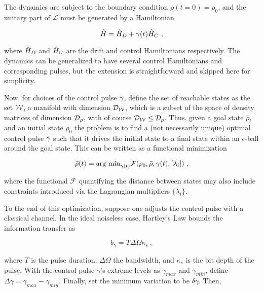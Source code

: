 The dynamics are subject to the boundary condition \(\rho(t=0) = \rho_0\), and
the unitary part of \(\mathcal{L}\) must be generated by a Hamiltonian

\begin{equation}
    \hat{H} = \hat{H}_D + \gamma(t) \hat{H}_C~,
\end{equation}

where \(\hat{H}_D\) and \(\hat{H}_C\) are the drift and control
Hamiltonians respectively. The dynamics can be generalized to have several
control Hamiltonians and corresponding pulses, but the extension is
straightforward and skipped here for simplicity.

Now, for choices of the control pulse \(\gamma\), define the set of
reachable states as the set \(\mathcal{W}\), a manifold with dimension
\(\mathcal{D}_{\mathcal{W}}\), which is a subset of the space of density matrices of
dimension \(\mathcal{D}_\rho\), with of course \(\mathcal{D}_{\mathcal{W}} \leq \mathcal{D}_\rho\).
Thus, given a goal state \(\bar{\rho}\), and an initial state \(\rho_0\) the
problem is to find a (not necessarily unique) optimal control pulse
\(\bar{\gamma}\) such that it drives the initial state to a final state
within an \(\epsilon\)-ball around the goal state. This can be written as a
functional minimization

\begin{equation}
    \bar{\rho}(t) = \text{arg min}_{\gamma(t)} 
    \mathcal{F}(\rho_0, \bar{\rho}, \gamma(t), [\lambda_i])~,
\end{equation}

where the functional \(\mathcal{F}\) quantifying the distance between states may
also include constraints introduced via the Lagrangian multipliers
\(\{\lambda_i\}\).

To the end of this optimization, suppose one adjusts the control pulse with a
classical channel. In the ideal noiseless case, Hartley's Law bounds the
information transfer as

\begin{equation}
    b_\gamma = T\Delta\Omega\kappa_s~,
\end{equation}

where \(T\) is the pulse duration, \(\Delta\Omega\) the bandwidth, and
\(\kappa_s\) is the bit depth of the pulse. With the control pulse \(\gamma\)'s
extreme levels as \(\gamma_{max}\) and \(\gamma_{min}\), define \(\Delta\gamma =
\gamma_{max} - \gamma_{min}\). Finally, set the minimum variation to be
\(\delta\gamma\). Then,

